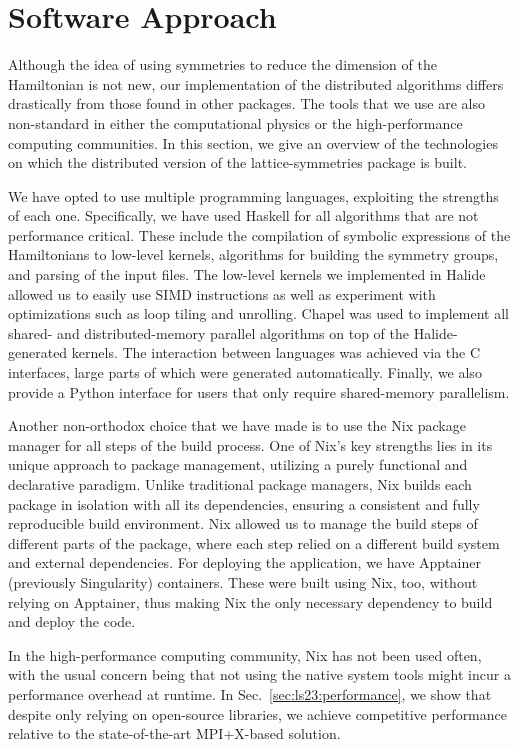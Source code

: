 \section{Software Approach}\label{sec:ls23:software-approach}

Although the idea of using symmetries to reduce the dimension of the Hamiltonian is not new, our implementation of the distributed algorithms differs drastically from those found in other packages. The tools that we use are also non-standard in either the computational physics or the high-performance computing communities. In this section, we give an overview of the technologies on which the distributed version of the lattice-symmetries package is built.

We have opted to use multiple programming languages, exploiting the strengths of each one. Specifically, we have used Haskell for all algorithms that are not performance critical. These include the compilation of symbolic expressions of the Hamiltonians to low-level kernels, algorithms for building the symmetry groups, and parsing of the input files. The low-level kernels we implemented in Halide~\cite{Ragan2013Halide} allowed us to easily use SIMD instructions as well as experiment with optimizations such as loop tiling and unrolling. Chapel was used to implement all shared- and distributed-memory parallel algorithms on top of the Halide-generated kernels. The interaction between languages was achieved via the C interfaces, large parts of which were generated automatically. Finally, we also provide a Python interface for users that only require shared-memory parallelism.

Another non-orthodox choice that we have made is to use the Nix package manager for all steps of the build process. One of Nix's key strengths lies in its unique approach to package management, utilizing a purely functional and declarative paradigm. Unlike traditional package managers, Nix builds each package in isolation with all its dependencies, ensuring a consistent and fully reproducible build environment. Nix allowed us to manage the build steps of different parts of the package, where each step relied on a different build system and external dependencies. For deploying the application, we have Apptainer (previously Singularity) containers. These were built using Nix, too, without relying on Apptainer, thus making Nix the only necessary dependency to build and deploy the code.

In the high-performance computing community, Nix has not been used often, with the usual concern being that not using the native system tools might incur a performance overhead at runtime. In Sec.~\ref{sec:ls23:performance}, we show that despite only relying on open-source libraries, we achieve competitive performance relative to the state-of-the-art MPI+X-based solution.

